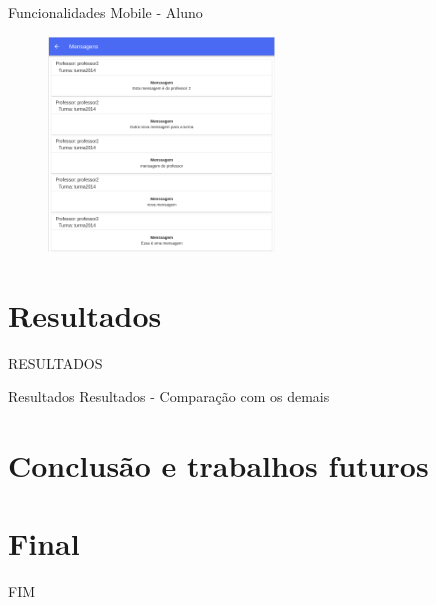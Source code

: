 \documentclass{aula-ifb}
\begin{document}
\begin{frame}{Funcionalidades Mobile - Aluno}
\begin{figure}[h]
\includegraphics[width=6cm]{figuras/mobile3.png}
\label{fig:facebookgraph}
\end{figure}
\end{frame}

\section{Resultados}
\begin{frame}
RESULTADOS
\end{frame}

\begin{frame}{Resultados}
Resultados - Comparação com os demais
\end{frame}

\section{Conclusão e trabalhos futuros}
\begin{frame}

\end{frame}

\section{Final}
\begin{frame}
FIM
\end{frame}
\end{document}
